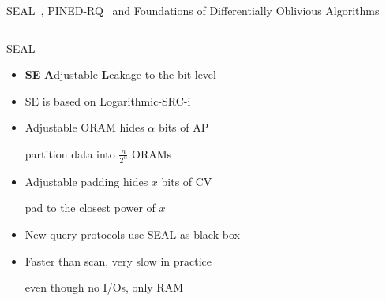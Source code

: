 		\begin{frame}{SEAL~\cite{seal}, PINED-RQ~\cite{pined-rq} and Foundations of Differentially Oblivious Algorithms~\cite{differential-obliviousness}}

			\begin{columns}[T,onlytextwidth]

					\begin{block}{SEAL~\cite{seal}}

						\begin{itemize}
							\item \textbf{SE} \textbf{A}djustable \textbf{L}eakage to the bit-level %
							\item SE is based on Logarithmic-SRC-i~\cite{practical-range-search}
							\item Adjustable ORAM hides $\alpha$ bits of AP \\
								\begin{small}
									partition data into $\frac{n}{2^\alpha}$ ORAMs
								\end{small}
							\item Adjustable padding hides $x$ bits of CV \\
								\begin{small}
									pad to the closest power of $x$
								\end{small}
							\item New query protocols use SEAL as black-box
							\item Faster than scan, very slow in practice \\
								\begin{small}
									even though no I/Os, only RAM
								\end{small}
						\end{itemize}

					\end{block}


\end{columns}
\end{frame}
